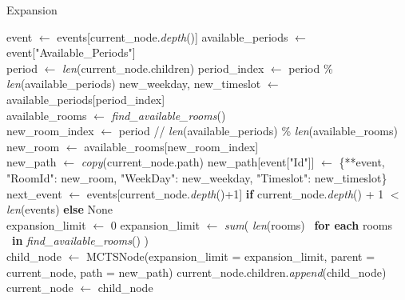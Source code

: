 \begin{algorithm}
\caption{Expansion}\label{expansion}
\begin{algorithmic}[1]
    \State event $\gets$ events[current\_node.\textit{depth}()]
    \State available\_periods $\gets$ event["Available\_Periods"]
    \\
    \State period $\gets$ \textit{len}(current\_node.children)
    \State period\_index $\gets$ period \% \textit{len}(available\_periods)
    \State new\_weekday, new\_timeslot $\gets$ available\_periods[period\_index]
    \\
    \State available\_rooms $\gets$ \textit{find\_available\_rooms}()
    \\
    \State new\_room\_index $\gets$ period // \textit{len}(available\_periods) \% \textit{len}(available\_rooms)
    \State new\_room $\gets$ available\_rooms[new\_room\_index]
    \\
    \State new\_path $\gets$ \textit{copy}(current\_node.path)
    \State new\_path[event["Id"]] $\gets$ \{**event, "RoomId": new\_room, "WeekDay": new\_weekday, "Timeslot": new\_timeslot\}
    \\
    \State next\_event $\gets$ events[current\_node.\textit{depth}()+1] \textbf{if} current\_node.\textit{depth}() + 1 $<$ \textit{len}(events) \textbf{else} None
    \\
         \State expansion\_limit $\gets$ 0
    \Else
         \State expansion\_limit $\gets$ \textit{sum}\big( \textit{len}(rooms) \ \textbf{for each} rooms \ \textbf{in} \textit{find\_available\_rooms}() \big)
    \EndIf
    \\
    \State child\_node $\gets$ MCTSNode(expansion\_limit = expansion\_limit, parent = current\_node, path = new\_path)
    \State current\_node.children.\textit{append}(child\_node)
    \State current\_node $\gets$ child\_node
\EndProcedure
\end{algorithmic}
\end{algorithm}

